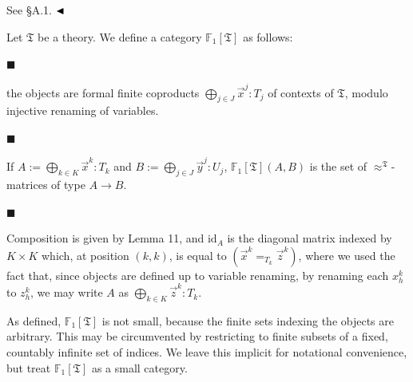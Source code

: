 \documentclass[10pt,a4paper]{amsart}
\begin{document}
 
See §A.1. $\hfill\blacktriangleleft$\par
 
 
 
Let $\mathfrak{T}$ be a theory. We define a category $\mathbb{F}_{1}[\mathfrak{T}]$ as follows:\par
  
\par\noindent  $\blacksquare$ 
 
the objects are formal finite coproducts $\bigoplus_{j\in J}\vec{x}^{j}:T_{j}$ of contexts of $\mathfrak{T}$, modulo injective renaming of variables.\par
 
 
 
\par\noindent  $\blacksquare$ 
 
If $A:=\bigoplus_{k\in K}\vec{x}^{k}:T_{k}$ and $B:=\bigoplus_{j\in J}\vec{y}^{j}:U_{j}$, $\mathbb{F}_{1}[\mathfrak{T}](A,B)$ is the set of $\approx^{\mathfrak{T}}$-matrices of type $A\to B$.\par
 
 
 
\par\noindent  $\blacksquare$ 
 
Composition is given by Lemma 11, and $\mathrm{id}_{A}$ is the diagonal matrix indexed by $K\times K$ which, at position $(k,k)$, is equal to $(\vec{x}^{k}=_{T_{k}}\vec{z}^{k})$, where we used the fact that, since objects are defined up to variable renaming, by renaming each $x^{k}_{h}$ to $z^{k}_{h}$, we may write $A$ as $\bigoplus_{k\in K}\vec{z}^{k}:T_{k}$.\par
 
 
  
As defined, $\mathbb{F}_{1}[\mathfrak{T}]$ is not small, because the finite sets indexing the objects are arbitrary. This may be circumvented by restricting to finite subsets of a fixed, countably infinite set of indices. We leave this implicit for notational convenience, but treat $\mathbb{F}_{1}[\mathfrak{T}]$ as a small category.\par
 
 
 
\end{document}
